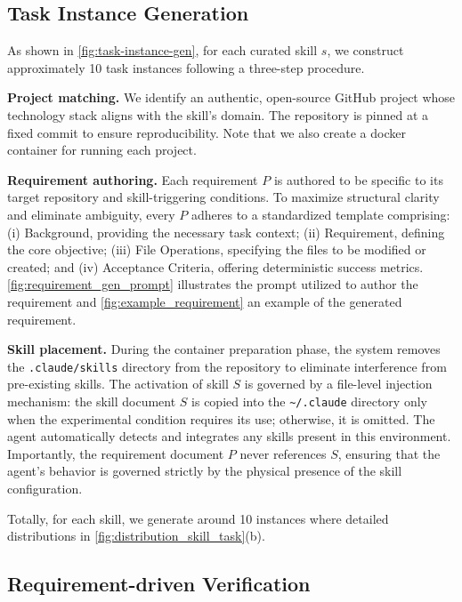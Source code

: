 \documentclass{article}
\begin{document}
\subsection{Task Instance Generation}
\label{subsec:instance}

    As shown in \autoref{fig:task-instance-gen}, for each curated skill $s$, we construct approximately 10 task instances following a three-step procedure.
    
    \textbf{Project matching.} We identify an authentic, open-source GitHub project whose technology stack aligns with the skill's domain. The repository is pinned at a fixed commit to ensure reproducibility. Note that we also create a docker container for running each project.
    
    \textbf{Requirement authoring.} 
    Each requirement $P$ is authored to be specific to its target repository and skill-triggering conditions. To maximize structural clarity and eliminate ambiguity, every $P$ adheres to a standardized template comprising: (i) Background, providing the necessary task context; (ii) Requirement, defining the core objective; (iii) File Operations, specifying the files to be modified or created; and (iv) Acceptance Criteria, offering deterministic success metrics.
    \autoref{fig:requirement_gen_prompt} illustrates the prompt utilized to author the requirement and \autoref{fig:example_requirement} an example of the generated requirement.
    
    \textbf{Skill placement.} During the container preparation phase, the system removes the \texttt{.claude/skills} directory from the repository to eliminate interference from pre-existing skills. The activation of skill $S$ is governed by a file-level injection mechanism: the skill document $S$ is copied into the \texttt{\textasciitilde/.claude} directory only when the experimental condition requires its use; otherwise, it is omitted. The agent automatically detects and integrates any skills present in this environment. Importantly, the requirement document $P$ never references $S$, ensuring that the agent's behavior is governed strictly by the physical presence of the skill configuration.
        
Totally, for each skill, we generate around 10 instances where detailed distributions in \autoref{fig:distribution_skill_task}(b).
\subsection{Requirement-driven Verification}
\label{subsec:verifier}
\end{document}

